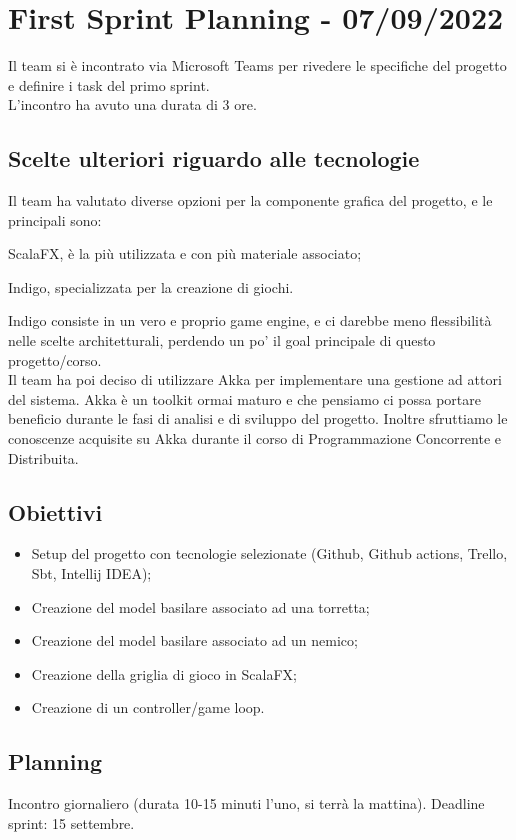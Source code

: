 \section*{First Sprint Planning - 07/09/2022}
Il team si è incontrato via Microsoft Teams per rivedere le specifiche del progetto e definire i task del primo sprint.\\
L'incontro ha avuto una durata di 3 ore.

\subsection*{Scelte ulteriori riguardo alle tecnologie}
Il team ha valutato diverse opzioni per la componente grafica del progetto, e le principali sono:
\item ScalaFX, è la più utilizzata e con più materiale associato;
\item Indigo, specializzata per la creazione di giochi.

Indigo consiste in un vero e proprio game engine, e ci darebbe meno flessibilità nelle scelte architetturali, perdendo un po' il goal principale di questo progetto/corso.\\

Il team ha poi deciso di utilizzare Akka per implementare una gestione ad attori del sistema. Akka è un toolkit ormai maturo e che pensiamo ci possa portare beneficio
durante le fasi di analisi e di sviluppo del progetto. Inoltre sfruttiamo le conoscenze acquisite su Akka durante il corso di Programmazione Concorrente e Distribuita.

\subsection*{Obiettivi}
\begin{itemize}
  \item Setup del progetto con tecnologie selezionate (Github, Github actions, Trello, Sbt, Intellij IDEA);
  \item Creazione del model basilare associato ad una torretta;
  \item Creazione del model basilare associato ad un nemico;
  \item Creazione della griglia di gioco in ScalaFX;
  \item Creazione di un controller/game loop.
\end{itemize}

\subsection*{Planning}
Incontro giornaliero (durata 10-15 minuti l'uno, si terrà la mattina).
Deadline sprint: 15 settembre.

